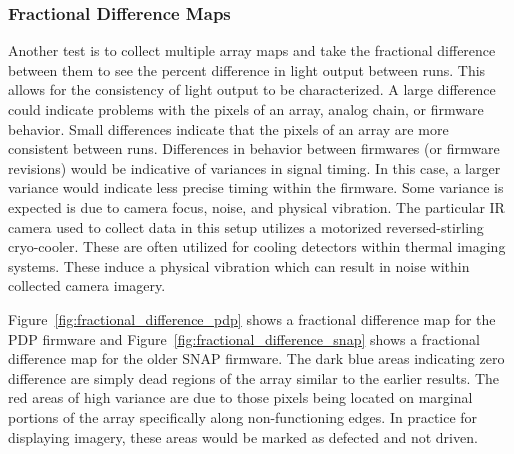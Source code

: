         \subsubsection{Fractional Difference Maps}

            Another test is to collect multiple array maps and take the fractional difference between them to see the percent difference in light output between runs. This allows for the consistency of light output to be characterized. A large difference could indicate problems with the pixels of an array, analog chain, or firmware behavior. Small differences indicate that the pixels of an array are more consistent between runs. Differences in behavior between firmwares (or firmware revisions) would be indicative of variances in signal timing. In this case, a larger variance would indicate less precise timing within the firmware. Some variance is expected is due to camera focus, noise, and physical vibration. The particular IR camera used to collect data in this setup utilizes a motorized reversed-stirling cryo-cooler. These are often utilized for cooling detectors within thermal imaging systems\cite{Organ1999}. These induce a physical vibration which can result in noise within collected camera imagery.

            Figure~\ref{fig:fractional_difference_pdp} shows a fractional difference map for the PDP firmware and Figure~\ref{fig:fractional_difference_snap} shows a fractional difference map for the older SNAP firmware. The dark blue areas indicating zero difference are simply dead regions of the array similar to the earlier results. The red areas of high variance are due to those pixels being located on marginal portions of the array specifically along non-functioning edges. In practice for displaying imagery, these areas would be marked as defected and not driven.

